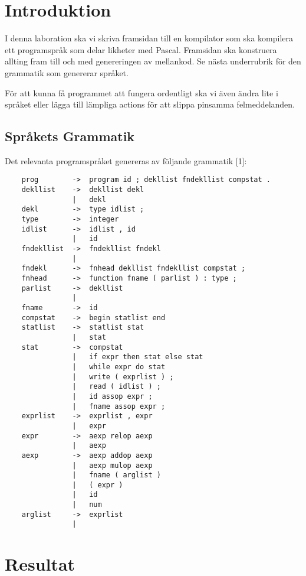 \section{Introduktion}
I denna laboration ska vi skriva framsidan till en kompilator som ska kompilera ett programspråk som delar likheter med Pascal. Framsidan ska konstruera allting fram till och med genereringen av mellankod. Se nästa underrubrik för den grammatik som genererar språket. 

För att kunna få programmet att fungera ordentligt ska vi även ändra lite i språket eller lägga till lämpliga actions för att slippa pinsamma felmeddelanden. 


\newpage
\subsection{Språkets Grammatik}
Det relevanta programspråket genereras av följande grammatik [1]:
\begin{scriptsize}
\begin{verbatim}
    prog        ->  program id ; dekllist fndekllist compstat .
    dekllist    ->  dekllist dekl
                |   dekl
    dekl        ->  type idlist ;
    type        ->  integer
    idlist      ->  idlist , id
                |   id
    fndekllist  ->  fndekllist fndekl
                |   
    fndekl      ->  fnhead dekllist fndekllist compstat ;
    fnhead      ->  function fname ( parlist ) : type ;
    parlist     ->  dekllist
                |   
    fname       ->  id
    compstat    ->  begin statlist end
    statlist    ->  statlist stat
                |   stat
    stat        ->  compstat
                |   if expr then stat else stat
                |   while expr do stat
                |   write ( exprlist ) ;
                |   read ( idlist ) ;
                |   id assop expr ;
                |   fname assop expr ;
    exprlist    ->  exprlist , expr
                |   expr
    expr        ->  aexp relop aexp
                |   aexp
    aexp        ->  aexp addop aexp
                |   aexp mulop aexp
                |   fname ( arglist )
                |   ( expr )
                |   id
                |   num
    arglist     ->  exprlist
                |   
\end{verbatim}
\end{scriptsize}



\section{Resultat}





